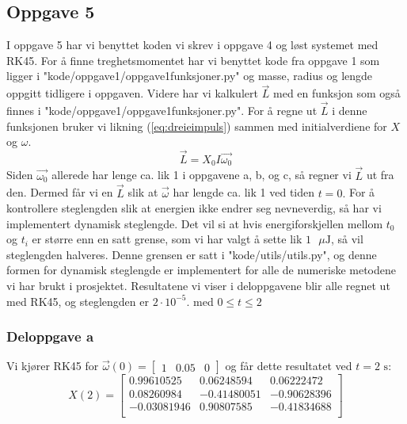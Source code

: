 \subsection{Oppgave 5}
\label{section:oppgave5}
I oppgave 5 har vi benyttet koden vi skrev i oppgave 4 og løst systemet med RK45. \newline\newline
For å finne treghetsmomentet har vi benyttet kode fra oppgave 1 som ligger i "kode/oppgave1/oppgave1funksjoner.py" og masse, radius og lengde oppgitt tidligere i oppgaven. Videre har vi kalkulert $\vec{L}$ med en funksjon som også finnes i "kode/oppgave1/oppgave1funksjoner.py". For å regne ut $\vec{L}$ i denne funksjonen bruker vi likning (\ref{eq:dreieimpuls}) sammen med initialverdiene for $X$ og $\omega.$
\begin{equation}
\vec{L} = X_0I\vec{\omega_0}
\end{equation}
Siden $\vec{\omega_0}$ allerede har lenge ca. lik 1 i oppgavene a, b, og c, så regner vi $\vec{L}$ ut fra den. Dermed får vi en $\vec{L}$ slik at $\vec{\omega}$ har lengde ca. lik 1 ved tiden $t=0.$\newline\newline
For å kontrollere steglengden slik at energien ikke endrer seg nevneverdig, så har vi implementert dynamisk steglengde. Det vil si at hvis energiforskjellen mellom $t_0$ og $t_{i}$ er større enn en satt grense, som vi har valgt å sette lik $1\text{ }\mu\text{J}$, så vil steglengden halveres. Denne grensen er satt i "kode/utils/utils.py", og denne formen for dynamisk steglengde er implementert for alle de numeriske metodene vi har brukt i prosjektet. Resultatene vi viser i deloppgavene blir alle regnet ut med RK45, og steglengden er $2\cdot10^{-5}.$ med $0\leq t \leq 2$
\subsubsection{Deloppgave a}
Vi kjører RK45 for $\vec{\omega}(0)=\begin{bmatrix}1&0.05&0\end{bmatrix}$ og får dette resultatet ved $t=2\text{ s}:$
\begin{equation}
X(2)=
\begin{bmatrix}
0.99610525 &  0.06248594 & 0.06222472\\
0.08260984 & -0.41480051 & -0.90628396\\
-0.03081946 & 0.90807585 & -0.41834688\\
\end{bmatrix}
\end{equation}
